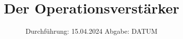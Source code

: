 

\subject{VERSUCH NUMMER 51}
\title{Der Operationsverstärker}
\date{
  Durchführung: 15.04.2024
  \hspace{3em}
  Abgabe: DATUM
}



\maketitle
\thispagestyle{empty}
\tableofcontents
\newpage
\setcounter{page}{1}







\newpage
\printbibliography
\nocite{ap51}
\nocite{matplotlib}
\nocite{numpy}
\nocite{scipy}
\nocite{uncertainties}
\nocite{reback2020pandas}

\newpage






